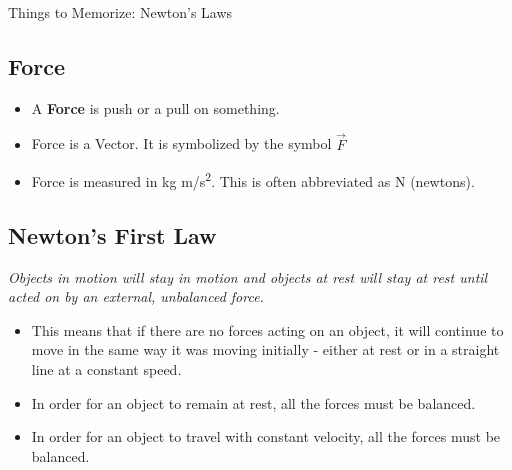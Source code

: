 \documentclass[letterpaper, 12pt]{article}
\begin{document}
	


\begin{center}Things to Memorize: Newton's Laws
\end{center}


\subsection*{Force}
\begin{itemize}
	\item A \textbf{Force} is push or a pull on something. 
	\item Force is a Vector.  It is symbolized by the symbol $\vec{F}$
	\item Force is measured in kg m/s\textsuperscript{2}.  This is often abbreviated as N (newtons).  
\end{itemize}
\subsection*{Newton's First Law}
\begin{center}
	\textit{Objects in motion will stay in motion and objects at rest will stay at rest until acted on by an external, unbalanced force.}
\end{center}

\begin{itemize}
	\item This means that if there are no forces acting on an object, it will continue to move in the same way it was moving initially - either at rest or in a straight line at a constant speed.
	\item In order for an object to remain at rest, all the forces must be balanced.
	\item In order for an object to travel with constant velocity, all the forces must be balanced.
	
\end{itemize}
\end{document}
